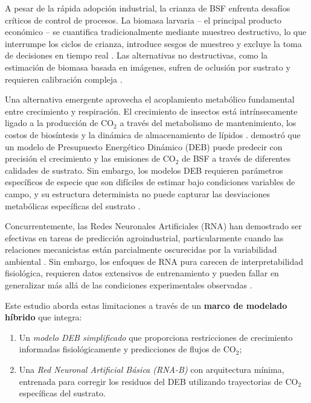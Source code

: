 \documentclass[12pt,a4paper]{article}
\begin{document}
A pesar de la r\'{a}pida adopci\'{o}n industrial, la crianza de BSF enfrenta desaf\'{i}os cr\'{i}ticos de control de procesos. La biomasa larvaria -- el principal producto econ\'{o}mico -- se cuantifica tradicionalmente mediante muestreo destructivo, lo que interrumpe los ciclos de crianza, introduce sesgos de muestreo y excluye la toma de decisiones en tiempo real \citep{dienerConversionOrganicMaterial2011}. Las alternativas no destructivas, como la estimaci\'{o}n de biomasa basada en im\'{a}genes, sufren de oclusi\'{o}n por sustrato y requieren calibraci\'{o}n compleja \citep{meneguzEffectRearingSubstrate2018}.

Una alternativa emergente aprovecha el acoplamiento metab\'{o}lico fundamental entre crecimiento y respiraci\'{o}n. El crecimiento de insectos est\'{a} intr\'{i}nsecamente ligado a la producci\'{o}n de CO$_2$ a trav\'{e}s del metabolismo de mantenimiento, los costos de bios\'{i}ntesis y la din\'{a}mica de almacenamiento de l\'{i}pidos \citep{arreseInsectFatBody2010}. \citet{eriksenDynamicModellingFeed2022} demostr\'{o} que un modelo de Presupuesto Energ\'{e}tico Din\'{a}mico (DEB) puede predecir con precisi\'{o}n el crecimiento y las emisiones de CO$_2$ de BSF a trav\'{e}s de diferentes calidades de sustrato. Sin embargo, los modelos DEB requieren par\'{a}metros espec\'{i}ficos de especie que son dif\'{i}ciles de estimar bajo condiciones variables de campo, y su estructura determinista no puede capturar las desviaciones metab\'{o}licas espec\'{i}ficas del sustrato \citep{padmanabhaComprehensiveDynamicGrowth2020}.

Concurrentemente, las Redes Neuronales Artificiales (RNA) han demostrado ser efectivas en tareas de predicci\'{o}n agroindustrial, particularmente cuando las relaciones mecanicistas est\'{a}n parcialmente oscurecidas por la variabilidad ambiental \citep{kamilarisDeepLearningAgriculture2018}. Sin embargo, los enfoques de RNA pura carecen de interpretabilidad fisiol\'{o}gica, requieren datos extensivos de entrenamiento y pueden fallar en generalizar m\'{a}s all\'{a} de las condiciones experimentales observadas \citep{lecunDeepLearning2015}.

Este estudio aborda estas limitaciones a trav\'{e}s de un \textbf{marco de modelado h\'{i}brido} que integra:
\begin{enumerate}
    \item Un \textit{modelo DEB simplificado} que proporciona restricciones de crecimiento informadas fisiol\'{o}gicamente y predicciones de flujos de CO$_2$;
    \item Una \textit{Red Neuronal Artificial B\'{a}sica (RNA-B)} con arquitectura m\'{i}nima, entrenada para corregir los residuos del DEB utilizando trayectorias de CO$_2$ espec\'{i}ficas del sustrato.
\end{enumerate}
\end{document}
